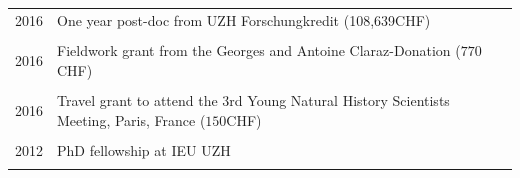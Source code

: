 \documentclass[a4paper,10pt]{article} %
\begin{document}
\subsection*{}
\begin{tabular}{p{4cm}|p{11cm}}
\hfill \textsc{2016} & One year post-doc from UZH Forschungkredit (108,639CHF)\\
\multicolumn{2}{c}{} \\
\hfill \textsc{2016} & Fieldwork grant from the Georges and Antoine Claraz-Donation ($770$CHF)\\
\multicolumn{2}{c}{} \\
\hfill \textsc{2016} & Travel grant to attend the 3rd Young Natural History Scientists Meeting, Paris, France ($150$CHF)\\
\multicolumn{2}{c}{} \\
\hfill \textsc{2012} & PhD fellowship at IEU UZH\\
\multicolumn{2}{c}{} \\
\end{tabular}
\end{document}
